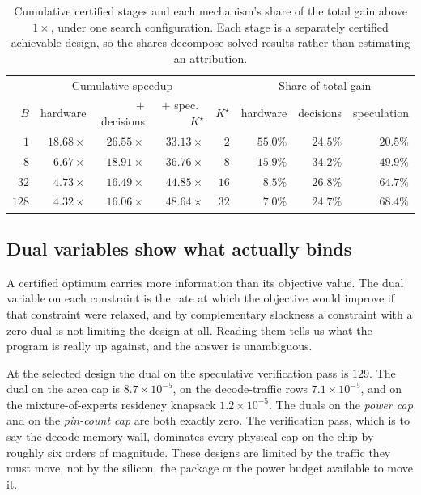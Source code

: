 \begin{table}[h]
\centering
\footnotesize
\caption{Cumulative certified stages and each mechanism's share of the total
gain above $1\times$, under one search configuration. Each stage is a separately
certified achievable design, so the shares decompose solved results rather than
estimating an attribution.}
\label{tab:mechanism}
\begin{tabular}{@{}rrrrrrrr@{}}
\toprule
& \multicolumn{3}{c}{Cumulative speedup} & & \multicolumn{3}{c}{Share of total gain} \\
\cmidrule(lr){2-4}\cmidrule(lr){6-8}
$B$ & hardware & $+$ decisions & $+$ spec.\ $K^\star$ & $K^\star$ &
hardware & decisions & speculation \\
\midrule
$1$   & $18.68\times$ & $26.55\times$ & $33.13\times$ & $2$  & $\mathbf{55.0\%}$ & $24.5\%$ & $20.5\%$ \\
$8$   & $6.67\times$  & $18.91\times$ & $36.76\times$ & $8$  & $15.9\%$ & $34.2\%$ & $49.9\%$ \\
$32$  & $4.73\times$  & $16.49\times$ & $44.85\times$ & $16$ & $8.5\%$  & $26.8\%$ & $\mathbf{64.7\%}$ \\
$128$ & $4.32\times$  & $16.06\times$ & $48.64\times$ & $32$ & $7.0\%$  & $24.7\%$ & $\mathbf{68.4\%}$ \\
\bottomrule
\end{tabular}
\end{table}


\subsection{Dual variables show what actually binds}
\label{sec:binding}

A certified optimum carries more information than its objective value. The dual
variable on each constraint is the rate at which the objective would improve if
that constraint were relaxed, and by complementary slackness a constraint with a
zero dual is not limiting the design at all. Reading them tells us what the
program is really up against, and the answer is unambiguous.

At the selected design the dual on the speculative verification pass is $129$.
The dual on the area cap is $8.7\times10^{-5}$, on the decode-traffic rows
$7.1\times10^{-5}$, and on the mixture-of-experts residency knapsack
$1.2\times10^{-5}$. The duals on the \emph{power cap} and on the \emph{pin-count
cap} are both exactly zero. The verification pass, which is to say the decode
memory wall, dominates every physical cap on the chip by roughly six orders of
magnitude. These designs are limited by the traffic they must move, not by the
silicon, the package or the power budget available to move it.

